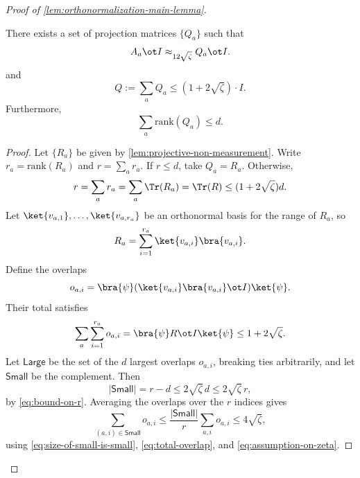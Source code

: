 \begin{proof}[Proof of \ref{lem:orthonormalization-main-lemma}]
	\begin{lemma}\label{lem:projective-low-rank-sum}
		\leanok
		There exists a set of projection matrices $\{Q_a\}$ such that
		\begin{equation*}
			A_a \ot I \approx_{12\sqrt{\zeta}} Q_a \ot I.
		\end{equation*}
		and
		\begin{equation*}
			Q:= \sum_a Q_a \leq (1+2\sqrt{\zeta}) \cdot I.
		\end{equation*}
		Furthermore,
		\begin{equation*}
			\sum_a \mathrm{rank}(Q_a) \leq d.
		\end{equation*}
	\end{lemma}
	\begin{proof}
		\leanok
		Let $\{R_a\}$ be given by \ref{lem:projective-non-measurement}. Write $r_a=\mathrm{rank}(R_a)$ and $r=\sum_a r_a$. If $r \leq d$, take $Q_a=R_a$. Otherwise,
		\begin{equation}\label{eq:bound-on-r}
			r
			=
			\sum_a r_a
			=
			\sum_a \Tr(R_a)
			=
			\Tr(R)
			\leq
			(1+2\sqrt{\zeta})d.
		\end{equation}
		Let $\ket{v_{a,1}},\ldots,\ket{v_{a,r_a}}$ be an orthonormal basis for the range of $R_a$, so
		\[
			R_a = \sum_{i=1}^{r_a} \ket{v_{a,i}}\bra{v_{a,i}}.
		\]
		Define the overlaps
		\[
			o_{a,i} = \bra{\psi} (\ket{v_{a,i}}\bra{v_{a,i}} \ot I)\ket{\psi}.
		\]
		Their total satisfies
		\begin{equation}\label{eq:total-overlap}
			\sum_a \sum_{i=1}^{r_a} o_{a,i}
			=
			\bra{\psi} R \ot I \ket{\psi}
			\leq
			1+2\sqrt{\zeta}.
		\end{equation}
		Let $\mathsf{Large}$ be the set of the $d$ largest overlaps $o_{a,i}$, breaking ties arbitrarily, and let $\mathsf{Small}$ be the complement. Then
		\begin{equation}\label{eq:size-of-small-is-small}
			|\mathsf{Small}|
			=
			r-d
			\leq
			2\sqrt{\zeta}\,d
			\leq
			2\sqrt{\zeta}\,r,
		\end{equation}
		by \ref{eq:bound-on-r}. Averaging the overlaps over the $r$ indices gives
		\begin{equation}\label{eq:small-overlaps}
			\sum_{(a,i)\in \mathsf{Small}} o_{a,i}
			\leq
			\frac{|\mathsf{Small}|}{r}\sum_{a,i} o_{a,i}
			\leq
			4\sqrt{\zeta},
		\end{equation}
		using \ref{eq:size-of-small-is-small}, \ref{eq:total-overlap}, and \ref{eq:assumption-on-zeta}.


\end{proof}
\end{proof}
